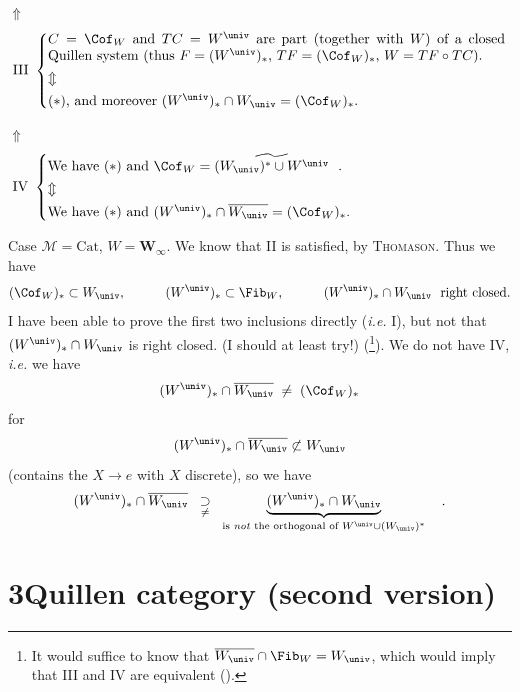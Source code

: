 \noindent$\Uparrow$
\[
\mathrm{III}\ \left\{
\begin{array}{@{}p{11.5cm}@{}}
$C = \Cof_W$ and $TC = W^{\univ}$ are part (together with $W$) of a closed Quillen system (thus $F = (W^{\univ})_*$, $TF = (\Cof_W)_*$, $W = TF \circ TC$). \\[1ex]
$\Updownarrow$ \\[1ex]
 $(*)$, and moreover $(W^{\univ})_* \cap W_{\univ} = (\Cof_W)_*$.
\end{array}\right.
\]

\noindent$\Uparrow$
\[
\mathrm{IV}\ \left\{
\begin{array}{@{}p{11.5cm}@{}}
We have $(*)$ and $\Cof_W = \widetilde{(W_{\univ})^* \cup W^{\univ}}$\ \ . \\[1ex]
$\Updownarrow$ \\[1ex]
We have $(*)$ and $(W^{\univ})_* \cap \overline{W_{\univ}} = (\Cof_W)_*$.
\end{array}\right.
\]

\clearpage
{}

\noindent Case $\mathcal{M} = \mathrm{Cat}$, $W = \mathbf{W}_\infty$. We know that II is satisfied, by \textsc{Thomason}. Thus we have
\[
(\Cof_W)_* \subset W_{\univ}, \qquad\quad (W^{\univ})_* \subset \Fib_W, \qquad\quad (W^{\univ})_* \cap W_{\univ} \ \text{ right closed.}
\]
I have been able to prove the first two inclusions directly (\textit{i.e.} I), but not that $(W^{\univ})_* \cap W_{\univ}$ is right closed. (I should at least try!) (\footnote[18]{It would suffice to know that $\overline{W_{\univ}} \cap \Fib_W = W_{\univ}$, which would imply that III and IV are equivalent (\footnotemark[19]).}). We do not have IV, \textit{i.e.} we have
\[
(W^{\univ})_* \cap \overline{W_{\univ}} \;\neq\; (\Cof_W)_*
\]
for
\[
(W^{\univ})_* \cap \overline{W_{\univ}} \not\subset W_{\univ}
\]
(contains the $X \longrightarrow e$ with $X$ discrete), so we have
\[
(W^{\univ})_* \cap \overline{W_{\univ}} \;\;\underset{\neq}{\supset}\;\; \underbrace{(W^{\univ})_* \cap W_{\univ}}_{\text{is \textit{not} the orthogonal of } W^{\univ} \cup (W_{\univ})^*} \quad . %
\]


\section*{3\quad Quillen category (second version)}

